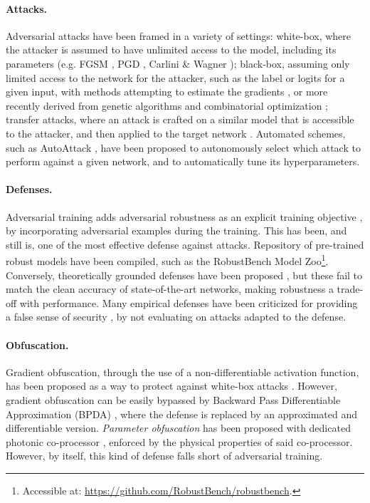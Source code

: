 \paragraph{Attacks.} Adversarial attacks have been framed in a variety of settings: white-box, where the attacker is assumed to have unlimited access to the model, including its parameters (e.g. FGSM \cite{Goodfellow2015ExplainingAH}, PGD \cite{madry2017towards, kurakin2016adversarial}, Carlini \& Wagner \cite{carlini2017towards}); black-box, assuming only limited access to the network for the attacker, such as the label or logits for a given input, with methods attempting to estimate the gradients \cite{chen2017zoo,ilyas2018black,ilyas2018prior}, or more recently derived from genetic algorithms \cite{andriushchenko2019square,meunier2019yet} and combinatorial optimization \cite{moon19aparsimonous}; transfer attacks, where an attack is crafted on a similar model that is accessible to the attacker, and then applied to the target network \cite{papernot2016transferability}. Automated schemes, such as AutoAttack \cite{Croce2020ReliableEO}, have been proposed to  autonomously select which attack to perform against a given network, and to automatically tune its hyperparameters. 

\paragraph{Defenses.} Adversarial training adds adversarial robustness as an explicit training objective \cite{Goodfellow2015ExplainingAH,madry2017towards}, by incorporating adversarial examples during the training. This has been, and still is, one of the most effective defense against attacks. Repository of pre-trained robust models have been compiled, such as the RobustBench Model Zoo\footnote{Accessible at: \url{https://github.com/RobustBench/robustbench}.}. Conversely, theoretically grounded defenses have been proposed \citep{lecuyer2018certified,KolterRandomizedSmoothing,araujo2020,pinot2019theoretical,wong2018scaling,wong2018provable}, but these fail to match the clean accuracy of state-of-the-art networks, making robustness a trade-off with performance. Many empirical defenses have been criticized for providing a false sense of security \cite{athalye2018obfuscated,tramer2019adversarial}, by not evaluating on attacks adapted to the defense.  

\paragraph{Obfuscation.} Gradient obfuscation, through the use of a non-differentiable activation function, has been proposed as a way to protect against white-box attacks \cite{papernot2017practical}. However, gradient obfuscation can be easily bypassed by Backward Pass Differentiable Approximation (BPDA) \cite{athalye2018obfuscated}, where the defense is replaced by an approximated and differentiable version. \emph{Parameter obfuscation} has been proposed with dedicated photonic co-processor \cite{Cappelli2021AdversarialRB}, enforced by the physical properties of said co-processor. However, by itself, this kind of defense falls short of adversarial training. 

